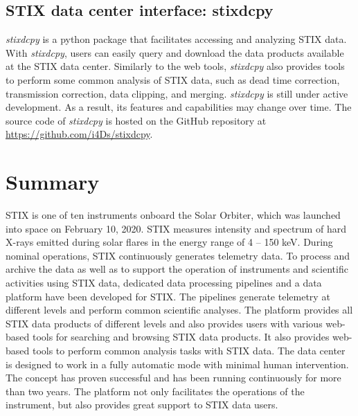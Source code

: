 \documentclass[referee]{preaa} %
\begin{document}
\subsection{STIX data center interface:  stixdcpy}
{\it stixdcpy} is a python package that facilitates accessing and analyzing STIX data. 
With {\it stixdcpy}, users can easily query and download the data products available at the STIX data center.
Similarly to the web tools, {\it stixdcpy} also provides tools to perform some common analysis of STIX data, such as dead time correction, transmission correction, data clipping, and merging. 
{\it stixdcpy} is still under active development. 
As a result, its features and 
capabilities may change over time.  The source code of {\it stixdcpy} is hosted on the GitHub repository at \url{https://github.com/i4Ds/stixdcpy}.
\section{Summary}
\label{sec:summary}
STIX is one of ten instruments onboard the Solar Orbiter, 
which was launched into space on February 10, 2020.
 STIX measures  
intensity and spectrum of hard X-rays emitted during solar flares
in the energy range of 4 -- 150 keV.  
 During nominal operations, STIX continuously generates telemetry data. 
 To process and archive the data as well as to support the operation of 
 instruments and scientific activities using STIX data, 
 dedicated data processing pipelines and a data platform have been 
 developed for STIX.
 The pipelines generate telemetry at different levels and perform common scientific analyses. 
 The platform provides 
 all STIX data products of different levels and also provides users 
 with various web-based tools for searching and browsing STIX data products. 
 It also provides web-based tools to perform common analysis tasks with STIX data. 
  The data center is designed to work in a 
 fully automatic mode with minimal human intervention. The concept has proven successful 
 and has been running continuously for more than two years.
The platform not only facilitates the operations of the instrument, but also provides great support to STIX data users.





\end{document}
